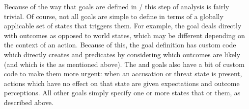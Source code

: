 \begin{enumerate}
    Because of the way that goals are defined in \dunyazad/ this step of analysis is fairly trivial.
    Of course, not all goals are simple to define in terms of a globally applicable set of states that triggers them.
    For example, the  goal deals directly with outcomes as opposed to world states, which may be different depending on the context of an action.
    Because of this, the  goal definition has custom code which directly creates  and  predicates by considering which outcomes are likely (and which is the  as mentioned above).
    The  and  goals also have a bit of custom code to make them more urgent: when an accusation or threat state is present, actions which have no effect on that state are given  expectations and  outcome perceptions.
    All other goals simply specify one or more states that    or  them, as described above.


\end{enumerate}

